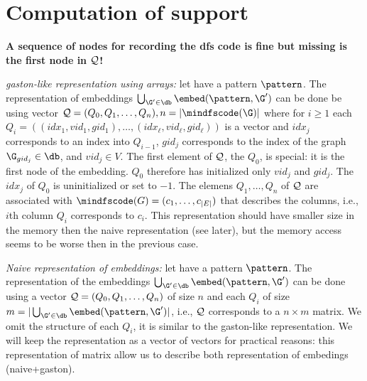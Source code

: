 \section{Computation of support}

\textbf{A sequence of nodes for recording the dfs code is fine but
  missing is the first node in ${\cal Q}$!}

\emph{gaston-like representation using arrays:} let have a pattern
$\pattern$. The representation of embeddings $\bigcup_{\G'\in\db}
\embed(\pattern, \G')$ can be done be using vector ${\cal Q} =
(Q_0,Q_1,\ldots,Q_n), n = |\mindfscode(\G)|$ where for $i\geq 1$
each $Q_i = ((idx_{1}, vid_{1}, gid_{1}), \ldots, (idx_{\ell},
vid_{\ell}, gid_{\ell}))$ is a vector and $idx_j$ corresponds to an
index into $Q_{i-1}$, $gid_j$ corresponds to the index of the graph
$\G_{gid_j}\in\db$, and $vid_j\in V$.  The first element of
${\cal Q}$, the $Q_0$, is special: it is the first node of the
embedding. $Q_0$ therefore has initialized only $vid_j$ and
$gid_j$. The $idx_j$ of $Q_0$ is uninitialized or set to $-1$. The
elemens $Q_1, \ldots, Q_n$ of ${\cal Q}$ are associated with
$\mindfscode(G)=(c_1,\ldots, c_{|E|})$ that describes the columns,
i.e., $i$th column $Q_i$ corresponds to $c_i$. This representation
should have smaller size in the memory then the naive representation
(see later), but the memory access seems to be worse then in the
previous case.

\emph{Naive representation of embeddings:} let have a pattern
$\pattern$. The representation of the embeddings
$\bigcup_{\G'\in\db}\embed(\pattern,\G')$ can be done using a
vector ${\cal Q}=(Q_0, Q_1,\ldots, Q_n)$ of size $n$ and each $Q_i$ of
size $m=|\bigcup_{\G'\in\db} \embed(\pattern, \G')|$, i.e.,
${\cal Q}$ corresponds to a $n\times m$ matrix. We omit the structure
of each $Q_i$, it is similar to the gaston-like representation.  We
will keep the representation as a vector of vectors for practical
reasons: this representation of matrix allow us to describe both
representation of embedings (naive+gaston).

